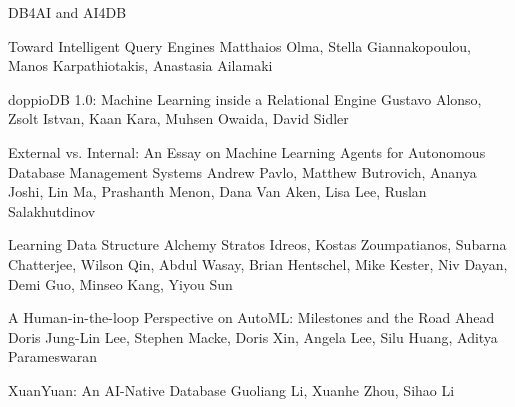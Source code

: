 \documentclass[11pt]{article}
\begin{document}
\begin{bulletin}
\begin{articlesection}{DB4AI and AI4DB}
%
%
%
\begin{article}
{Toward Intelligent Query Engines}
{Matthaios Olma,  Stella Giannakopoulou,  Manos Karpathiotakis, Anastasia Ailamaki}
\graphicspath{{submissions/adaptivedb/}}

\end{article}


\begin{article}
{doppioDB 1.0: Machine Learning inside a Relational Engine}
{Gustavo Alonso, Zsolt Istvan, Kaan Kara, Muhsen Owaida, David Sidler}
\graphicspath{{submissions/gustavo/}}

\end{article}


\begin{article}
{External vs. Internal: An Essay on  Machine Learning Agents for  Autonomous Database Management Systems}
{Andrew Pavlo, Matthew Butrovich, Ananya Joshi, Lin Ma, Prashanth 
Menon, Dana Van Aken, Lisa Lee, Ruslan Salakhutdinov}
\graphicspath{{submissions/selfdriving/}}

\end{article}



\begin{article}
{Learning Data Structure Alchemy}
{Stratos Idreos, 
Kostas Zoumpatianos, 
Subarna Chatterjee, 
Wilson Qin,
Abdul Wasay,
Brian Hentschel, 
Mike Kester,
Niv Dayan,
Demi Guo,
Minseo Kang,
Yiyou Sun
}
\graphicspath{{submissions/Learning/}}

\end{article}



\begin{article}
{A Human-in-the-loop Perspective on AutoML: Milestones and the Road Ahead}
{Doris Jung-Lin Lee, Stephen Macke, Doris Xin, Angela Lee, Silu Huang, Aditya Parameswaran}
\graphicspath{{submissions/automl/}}

\end{article}

\begin{article}
{XuanYuan: An AI-Native Database}
{Guoliang Li, Xuanhe Zhou, Sihao Li}
\graphicspath{{submissions/ainative/}}

\end{article}




\end{articlesection}
\end{bulletin}
\end{document}
